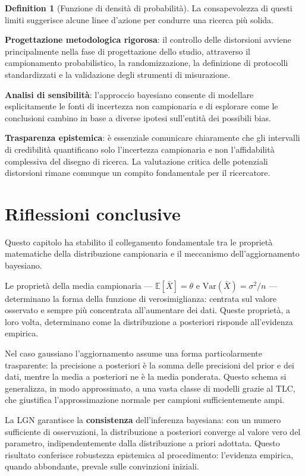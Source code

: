 \documentclass[
  letterpaper,
  DIV=11,
  numbers=noendperiod,
  oneside]{scrreprt}
\theoremstyle{definition}
\theoremstyle{plain}
\theoremstyle{definition}
\newtheorem{definition}{Definition}[chapter]
\theoremstyle{remark}
\begin{document}
\begin{definition}[Funzione di densità di
probabilità]
La consapevolezza di questi limiti suggerisce alcune linee d'azione per
condurre una ricerca più solida.

\textbf{Progettazione metodologica rigorosa}: il controllo delle
distorsioni avviene principalmente nella fase di progettazione dello
studio, attraverso il campionamento probabilistico, la randomizzazione,
la definizione di protocolli standardizzati e la validazione degli
strumenti di misurazione.

\textbf{Analisi di sensibilità}: l'approccio bayesiano consente di
modellare esplicitamente le fonti di incertezza non campionaria e di
esplorare come le conclusioni cambino in base a diverse ipotesi
sull'entità dei possibili bias.

\textbf{Trasparenza epistemica}: è essenziale comunicare chiaramente che
gli intervalli di credibilità quantificano solo l'incertezza campionaria
e non l'affidabilità complessiva del disegno di ricerca. La valutazione
critica delle potenziali distorsioni rimane comunque un compito
fondamentale per il ricercatore.

\section*{Riflessioni conclusive}\label{riflessioni-conclusive-13}


Questo capitolo ha stabilito il collegamento fondamentale tra le
proprietà matematiche della distribuzione campionaria e il meccanismo
dell'aggiornamento bayesiano.

Le proprietà della media campionaria ---
\(\mathbb{E}[\bar{X}] = \theta\) e \(\text{Var}(\bar{X}) = \sigma^2/n\)
--- determinano la forma della funzione di verosimiglianza: centrata sul
valore osservato e sempre più concentrata all'aumentare dei dati. Queste
proprietà, a loro volta, determinano come la distribuzione a posteriori
risponde all'evidenza empirica.

Nel caso gaussiano l'aggiornamento assume una forma particolarmente
trasparente: la precisione a posteriori è la somma delle precisioni del
prior e dei dati, mentre la media a posteriori ne è la media ponderata.
Questo schema si generalizza, in modo approssimato, a una vasta classe
di modelli grazie al TLC, che giustifica l'approssimazione normale per
campioni sufficientemente ampi.

La LGN garantisce la \textbf{consistenza} dell'inferenza bayesiana: con
un numero sufficiente di osservazioni, la distribuzione a posteriori
converge al valore vero del parametro, indipendentemente dalla
distribuzione a priori adottata. Questo risultato conferisce robustezza
epistemica al procedimento: l'evidenza empirica, quando abbondante,
prevale sulle convinzioni iniziali.


\end{definition}
\end{document}
